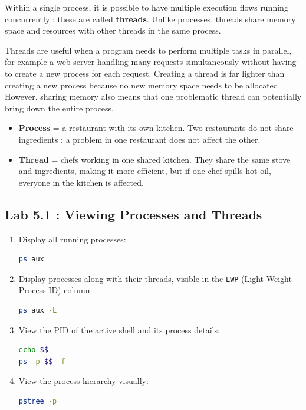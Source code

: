 Within a single process, it is possible to have multiple execution flows
running concurrently : these are called \textbf{threads}. Unlike processes,
threads share memory space and resources with other threads in the same process.

Threads are useful when a program needs to perform multiple tasks in parallel,
for example a web server handling many requests simultaneously without having
to create a new process for each request. Creating a thread is far lighter than
creating a new process because no new memory space needs to be allocated.
However, sharing memory also means that one problematic thread can potentially
bring down the entire process.

\begin{examplebox}
  \begin{itemize}
    \item \textbf{Process} = a restaurant with its own kitchen. Two restaurants
      do not share ingredients : a problem in one restaurant does not affect
      the other.
    \item \textbf{Thread} = chefs working in one shared kitchen. They share
      the same stove and ingredients, making it more efficient, but if one
      chef spills hot oil, everyone in the kitchen is affected.
  \end{itemize}
\end{examplebox}

\subsection*{Lab 5.1 : Viewing Processes and Threads}

\begin{enumerate}
  \item Display all running processes:
\begin{lstlisting}[language=bash, caption={Displaying all processes}]
ps aux
\end{lstlisting}

  \item Display processes along with their threads, visible in the \texttt{LWP}
    (Light-Weight Process ID) column:
\begin{lstlisting}[language=bash, caption={Displaying processes with threads}]
ps aux -L
\end{lstlisting}

  \item View the PID of the active shell and its process details:
\begin{lstlisting}[language=bash, caption={Current shell process details}]
echo $$
ps -p $$ -f
\end{lstlisting}

  \item View the process hierarchy visually:
\begin{lstlisting}[language=bash, caption={Process tree}]
pstree -p
\end{lstlisting}
\end{enumerate}

